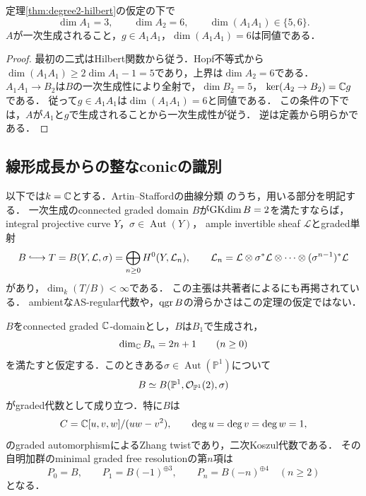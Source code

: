 \documentclass[11pt,a4paper]{ltjsarticle}
\begin{document}
\begin{proposition}[一次生成に残る二つの場合]
\label{prop:degree2-generation-gap}
定理\ref{thm:degree2-hilbert}の仮定の下で
\[
 \dim A_1=3,\qquad \dim A_2=6,\qquad
 \dim(A_1A_1)\in\{5,6\}.
\]
$A$が一次生成されること，$g\in A_1A_1$，$\dim(A_1A_1)=6$は同値である．
\end{proposition}

\begin{proof}
最初の二式はHilbert関数から従う．Hopf不等式から
$\dim(A_1A_1)\geq2\dim A_1-1=5$であり，上界は$\dim A_2=6$である．
$A_1A_1\to B_2$は$B$の一次生成性により全射で，$\dim B_2=5$，
$\ker(A_2\to B_2)=\mathbb C g$である．
従って$g\in A_1A_1$は$\dim(A_1A_1)=6$と同値である．
この条件の下では，$A$が$A_1$と$g$で生成されることから一次生成性が従う．
逆は定義から明らかである．
\end{proof}


\subsection{線形成長からの整なconicの識別}
\label{subsec:domain-conic-identification}

以下では$k=\mathbb C$とする．Artin--Staffordの曲線分類
\cite[Theorem~0.2]{ASquadratic}のうち，用いる部分を明記する．
一次生成のconnected graded domain $B$が$\operatorname{GKdim} B=2$を満たすならば，
integral projective curve $Y$，$\sigma\in\operatorname{Aut}(Y)$，
ample invertible sheaf $\mathcal L$とgraded単射
\[
 B\lhook\joinrel\longrightarrow
 T=B(Y,\mathcal L,\sigma)
   =\bigoplus_{n\geq0}H^0(Y,\mathcal L_n),
 \qquad
 \mathcal L_n=\mathcal L\otimes\sigma^*\mathcal L\otimes\cdots
                   \otimes(\sigma^{n-1})^*\mathcal L
\]
があり，$\dim_k(T/B)<\infty$である．
この主張は共著者による\cite[Theorem~5.2]{SVdBsurvey}にも再掲されている．
ambientなAS-regular代数や，$\operatorname{qgr} B$の滑らかさはこの定理の仮定ではない．

\begin{proposition}
\label{prop:domain-conic-identification}
$B$をconnected graded $\mathbb C$-domainとし，$B$は$B_1$で生成され，
\[
 \dim_\mathbb C B_n=2n+1\qquad(n\geq0)
\]
を満たすと仮定する．このときある$\sigma\in\operatorname{Aut}(\mathbb P^1)$について
\[
 B\simeq B(\mathbb P^1,\mathcal O_{\mathbb P^1}(2),\sigma)
\]
がgraded代数として成り立つ．特に$B$は
\[
 C=\mathbb C[u,v,w]/(uw-v^2),\qquad\deg u=\deg v=\deg w=1,
\]
のgraded automorphismによるZhang twistであり，二次Koszul代数である．
その自明加群のminimal graded free resolutionの第$n$項は
\[
 P_0=B,\qquad P_1=B(-1)^{\oplus3},\qquad
 P_n=B(-n)^{\oplus4}\quad(n\geq2)
\]
となる．
\end{proposition}
\end{document}
